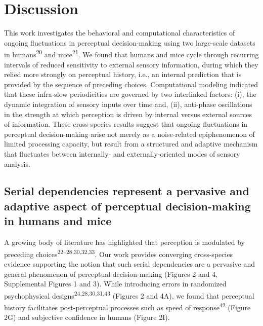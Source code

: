 \documentclass[
]{article}
\begin{document}
\newpage

\hypertarget{discussion}{%
\section{Discussion}\label{discussion}}

This work investigates the behavioral and computational characteristics
of ongoing fluctuations in perceptual decision-making using two
large-scale datasets in humans\textsuperscript{20} and
mice\textsuperscript{21}. We found that humans and mice cycle through
recurring intervals of reduced sensitivity to external sensory
information, during which they relied more strongly on perceptual
history, i.e., an internal prediction that is provided by the sequence
of preceding choices. Computational modeling indicated that these
infra-slow periodicities are governed by two interlinked factors: (i),
the dynamic integration of sensory inputs over time and, (ii),
anti-phase oscillations in the strength at which perception is driven by
internal versus external sources of information. These cross-species
results suggest that ongoing fluctuations in perceptual decision-making
arise not merely as a noise-related epiphenomenon of limited processing
capacity, but result from a structured and adaptive mechanism that
fluctuates between internally- and externally-oriented modes of sensory
analysis.

\hypertarget{serial-dependencies-represent-a-pervasive-and-adaptive-aspect-of-perceptual-decision-making-in-humans-and-mice}{%
\subsection{Serial dependencies represent a pervasive and adaptive
aspect of perceptual decision-making in humans and
mice}\label{serial-dependencies-represent-a-pervasive-and-adaptive-aspect-of-perceptual-decision-making-in-humans-and-mice}}

A growing body of literature has highlighted that perception is
modulated by preceding choices\textsuperscript{22--28,30,32,33}. Our
work provides converging cross-species evidence supporting the notion
that such serial dependencies are a pervasive and general phenomenon of
perceptual decision-making (Figures 2 and 4, Supplemental Figures 1 and
3). While introducing errors in randomized psychophysical
designs\textsuperscript{24,28,30,31,43} (Figures 2 and 4A), we found
that perceptual history facilitates post-perceptual processes such as
speed of response\textsuperscript{42} (Figure 2G) and subjective
confidence in humans (Figure 2I).
\end{document}
